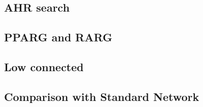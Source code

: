\subsection{AHR search}

\subsection{PPARG and RARG}

\subsection{Low connected}

\subsection{Comparison with Standard Network}